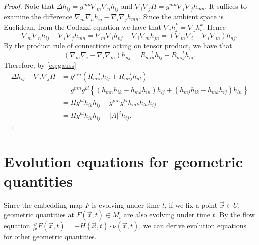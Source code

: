 \begin{proof}
	Note that $\Delta h_{ij}^{} = g_{}^{mn} \nabla_{m}\nabla_{n} h_{ij}^{} $ and $\nabla_{i}\nabla_{j} H = g_{}^{mn } \nabla_{i}\nabla_{j} h_{mn }^{} $. It suffices to examine the difference $\nabla_{m}\nabla_{n} h_{ij}^{} - \nabla_{i}\nabla_{j} h_{mn}^{} .$ Since the ambient space is Euclidean, from the Codazzi equation we have that $\nabla_{i}^{} h_{j}^{k} = \nabla_{j}^{} h_{i}^{k}$. Hence \[\nabla_{m}\nabla_{n} h_{ij}^{} - \nabla_{i}\nabla_{j} h_{mn}^{} = \nabla_{m}\nabla_{i} h_{nj}^{} - \nabla_{i}\nabla_{m} h_{jn}^{}=(\nabla_{m}\nabla_{i}  - \nabla_{i}\nabla_{m})h_{nj}^{}.\] By the product rule of connections acting on tensor product, we have that \[(\nabla_{m}\nabla_{i}  - \nabla_{i}\nabla_{m})h_{nj}^{} = R_{min}^{\quad\  l} h_{lj}^{} + R_{mij}^{\quad \ l} h_{nl }^{}.  \]
	Therefore, by \autoref{eq:gauss}
	\begin{equation*}
		\begin{split}
			\Delta h_{ij}^{} - \nabla_{i}\nabla_{j} H
			&= g_{}^{mn} (R_{min }^{\quad \ l} h_{lj}^{} + R_{mij}^{\quad \ l} h_{nl }^{} ) \\
			&= g_{}^{mn } g_{}^{kl} \left\{ \left( h_{mn}^{} h_{ik }^{} -h_{mk }^{} h_{in }^{}  \right)  h_{lj}^{} + (h_{mj }^{} h_{ik }^{} - h_{mk }^{} h_{ij}^{} )h_{ln}^{} \right\} \\
			&= H g_{}^{kl} h_{ik }^{}  h_{lj}^{} - g_{}^{mn } g_{}^{kl } h_{mk }^{} h_{ln }^{} h_{ij}^{} \\
			&= H g_{}^{kl} h_{ik }^{}  h_{lj}^{} - \left| A \right| ^2 h_{ij}^{} .
		\end{split}
	\end{equation*}
\end{proof}


\section{Evolution equations for geometric quantities}


Since the embedding map $F$ is evolving under time $t$, if we fix a point $\vec{x} \in U$, geometric quantities at $F(\vec{x},t) \in M_t$ are also evolving under time $t$. By the flow equation $\frac{\partial }{\partial t} F(\vec{x},t)=-H(\vec{x},t) \cdot \nu (\vec{x},t)$, we can derive evolution equations for other geometric quantities.

